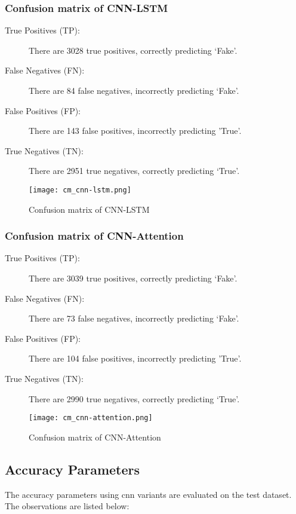 \subsubsection{Confusion matrix of CNN-LSTM}

\begin{description}
    \item[True Positives (TP):] There are 3028 true positives, correctly predicting ‘Fake’.
    \item[False Negatives (FN):] There are 84 false negatives, incorrectly predicting ‘Fake’.
    \item[False Positives (FP):] There are 143 false positives, incorrectly predicting 'True'.
    \item[True Negatives (TN): ] There are 2951 true negatives, correctly predicting ‘True’.
\end{description}

\begin{figure}[h]
    \centering
    \texttt{[image: cm\_cnn-lstm.png]}
    \caption{Confusion matrix of CNN-LSTM}
    \label{fig:cm_cnn-lstm}
\end{figure}
\clearpage
\subsubsection{Confusion matrix of CNN-Attention}

\begin{description}
    \item[True Positives (TP):] There are 3039 true positives, correctly predicting ‘Fake’.
    \item[False Negatives (FN):] There are 73 false negatives, incorrectly predicting ‘Fake’.
    \item[False Positives (FP):] There are 104 false positives, incorrectly predicting 'True'.
    \item[True Negatives (TN): ] There are 2990 true negatives, correctly predicting ‘True’.
\end{description}

\begin{figure}[h]
    \centering
    \texttt{[image: cm\_cnn-attention.png]}
    \caption{Confusion matrix of CNN-Attention}
    \label{fig:cm_cnn-attention}
\end{figure}


\subsection{Accuracy Parameters} 
The accuracy parameters using \ac{cnn} variants are evaluated on the test dataset. The observations are listed below:

